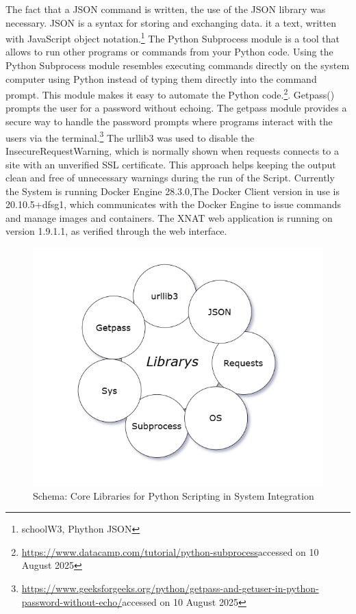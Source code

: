 The fact that a JSON command is written, the use of the JSON library was necessary. JSON is a syntax for storing and exchanging data. it a text, written with JavaScript object notation.\footnote{schoolW3, Phython JSON}
The Python Subprocess module is a tool that allows to run other programs or commands from your Python code. Using the Python Subprocess module resembles executing commands directly on the system computer using Python instead of typing them directly into the command prompt. This module makes it easy to automate the Python code.\footnote{\url{https://www.datacamp.com/tutorial/python-subprocess}accessed on 10 August 2025}. Getpass() prompts the user for a password without echoing. The getpass module provides a secure way to handle the password prompts where programs interact with the users via the terminal.\footnote{\url{https://www.geeksforgeeks.org/python/getpass-and-getuser-in-python-password-without-echo/}accessed on 10 August 2025}
 The urllib3 was used to disable the InsecureRequestWarning, which is normally shown when requests connects to a site with an unverified SSL certificate. This approach helps keeping the output clean and free of unnecessary warnings during the run of the Script.
 Currently the System is running Docker Engine 28.3.0,The Docker Client version in use is 20.10.5+dfsg1, which communicates with the Docker Engine to issue commands and manage images and containers. The XNAT web application is running on version 1.9.1.1, as verified through the web interface. 
 

\begin{figure}
    \centering
    \includegraphics[width=0.7\linewidth]{en/content/lp.png}
    \caption{Schema: Core Libraries for Python Scripting in System Integration }
    \label{fig:enter-label}
\end{figure}


